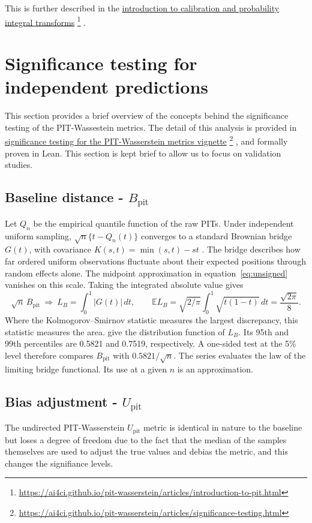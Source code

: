 \documentclass[twoside,11pt,hyphens]{article}
\newcommand{\Bpit}{B_{\mathrm{pit}}}
\newcommand{\Upit}{U_{\mathrm{pit}}}
\newcommand{\pkgdownurl}{https://ai4ci.github.io/pit-wasserstein}
\newcommand{\vignette}[2]{%
  \href{\pkgdownurl/articles/#1.html}{#2}%
  \footnote{\url{\pkgdownurl/articles/#1.html}}%
}
\begin{document}
This is further described in the \vignette{introduction-to-pit}{introduction to calibration and probability integral transforms}.

\section{Significance testing for independent predictions}
\label{sec:null}

This section provides a brief overview of the concepts behind the significance testing of the PIT-Wassestein metrics. The detail of this analysis is provided in \vignette{significance-testing}{significance testing for the PIT-Wasserstein metrics vignette}, and formally proven in Lean. This section is kept brief to allow us to focus on validation studies.

\subsection{Baseline distance - $\Bpit$}

Let $Q_n$ be the empirical quantile function of the raw PITs. Under independent uniform sampling, $\sqrt n\{t-Q_n(t)\}$ converges to a standard Brownian bridge $G(t)$, with covariance $K(s,t)=\min(s,t)-st$ \citep{bhattacharya2021}. The bridge describes how far ordered uniform observations fluctuate about their expected positions through random effects alone. The midpoint approximation in equation~\eqref{eq:unsigned} vanishes on this scale. Taking the integrated absolute value gives
\begin{equation}
 \sqrt n\,\Bpit\ \Longrightarrow\ L_B=\int_0^1|G(t)|\,dt,
 \qquad \mathbb{E}L_B=\sqrt{2/\pi}\int_0^1\!\sqrt{t(1-t)}\,dt=\frac{\sqrt{2\pi}}8 .
 \label{eq:baseline-limit}
\end{equation}
Where the Kolmogorov--Smirnov statistic measures the largest discrepancy, this statistic measures the area. \citet{johnson-killeen-1983} give the distribution function of $L_B$. Its 95th and 99th percentiles are 0.5821 and 0.7519, respectively. A one-sided test at the 5\% level therefore compares $\Bpit$ with $0.5821/\sqrt n$. The series evaluates the law of the limiting bridge functional. Its use at a given $n$ is an approximation.

\subsection{Bias adjustment - $\Upit$}

The undirected PIT-Wasserstein $\Upit$ metric is identical in nature to the baseline but loses a degree of freedom due to the fact that the median of the samples themselves are used to adjust the true values and debias the metric, and this changes the signifiance levels.
\end{document}
